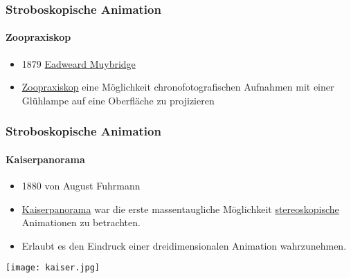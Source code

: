 \begin{frame}
    \frametitle{Stroboskopische Animation}
    \framesubtitle{Zoopraxiskop}
    \begin{minipage}{0.5\textwidth}
        \begin{itemize}
            \item 1879 \href{https://de.wikipedia.org/wiki/Eadweard_Muybridge}{Eadweard Muybridge}
            \item \href{https://de.wikipedia.org/wiki/Zoopraxiskop}{Zoopraxiskop} eine Möglichkeit chronofotografischen Aufnahmen mit einer Glühlampe auf eine Oberfläche zu projizieren 
        \end{itemize}
    \end{minipage} \hfill
    \begin{minipage}{0.45\textwidth}
    \end{minipage}
\end{frame}

\begin{frame}
    \frametitle{Stroboskopische Animation}
    \framesubtitle{Kaiserpanorama}
    \begin{minipage}{0.5\textwidth}
        \begin{itemize}
            \item 1880 von August Fuhrmann
            \item \href{https://de.wikipedia.org/wiki/Kaiserpanorama}{Kaiserpanorama} war die erste massentaugliche Möglichkeit \href{https://de.wikipedia.org/wiki/Stereoskopie}{stereoskopische} Animationen zu betrachten.
            \item Erlaubt es den Eindruck einer dreidimensionalen Animation wahrzunehmen.
        \end{itemize}
    \end{minipage} \hfill
    \begin{minipage}{0.45\textwidth}
        \texttt{[image: kaiser.jpg]}
    \end{minipage}
\end{frame}

